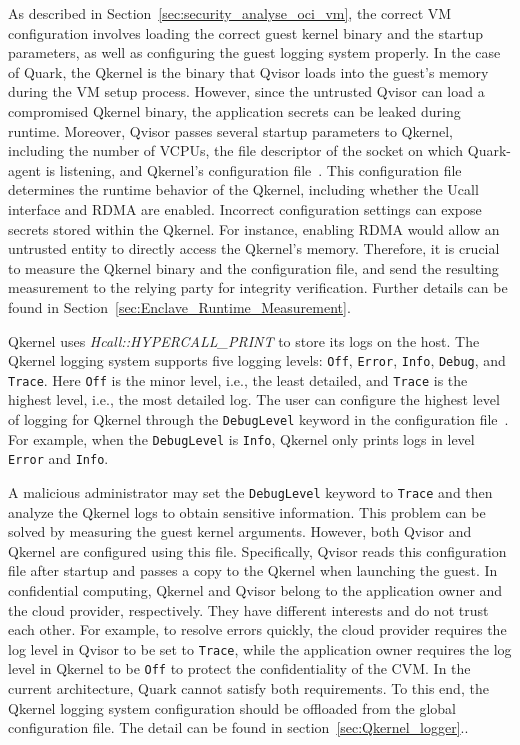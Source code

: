 As described in Section~\ref{sec:security_analyse_oci_vm}, the correct VM configuration involves loading the correct guest kernel binary and the startup parameters, as well as configuring the guest logging system properly. In the case of Quark, the Qkernel is the binary that Qvisor loads into the guest's memory during the VM setup process. However, 
since the untrusted Qvisor can load a compromised Qkernel binary, the application secrets can be leaked during runtime. Moreover, Qvisor passes several startup parameters to Qkernel, including the number of VCPUs, the file descriptor of the socket on which Quark-agent is listening, and Qkernel's configuration file~\cite*{quark_conf_file}. This configuration file 
determines the runtime behavior of the Qkernel, including whether the Ucall interface and RDMA are enabled. Incorrect configuration settings can expose secrets stored within the Qkernel. For instance, enabling RDMA would allow an untrusted entity to directly access the Qkernel's memory. Therefore, it is crucial to measure the Qkernel binary and the configuration 
file, and send the resulting measurement to the relying party for integrity verification. Further details can be found in Section~\ref{sec:Enclave_Runtime_Measurement}.

Qkernel uses \emph{Hcall::HYPERCALL\_PRINT} to store its logs on the host. The Qkernel logging system supports five logging levels: \texttt{Off}, \texttt{Error}, \texttt{Info}, \texttt{Debug}, and \texttt{Trace}. Here \texttt{Off} is the minor level, i.e., the least detailed, and \texttt{Trace} is 
the highest level, i.e., the most detailed log. The user can configure the highest level of logging for Qkernel through the \texttt{DebugLevel} keyword in the configuration file~\cite*{quark_conf_file}. For example, when the \texttt{DebugLevel} is \texttt{Info}, Qkernel only prints 
logs in level \texttt{Error} and \texttt{Info}.

A malicious administrator may set the \texttt{DebugLevel} keyword to \texttt{Trace} and then analyze the Qkernel logs to obtain sensitive information. This problem can be solved by measuring the guest kernel arguments. However, both Qvisor and Qkernel are configured using this file. Specifically, 
Qvisor reads this configuration file after startup and passes a copy to the Qkernel when launching the guest. In confidential computing, Qkernel and Qvisor belong to the application owner and the cloud provider, respectively. They have different interests and do not trust each other. 
For example, to resolve errors quickly, the cloud provider requires the log level in Qvisor to be set to \texttt{Trace}, while the application owner requires the 
log level in Qkernel to be \texttt{Off} to protect the confidentiality of the CVM. In the current architecture, Quark cannot satisfy both requirements. To this end, the Qkernel logging system configuration should be offloaded from the global configuration file. The detail can be found in section~\ref{sec:Qkernel_logger}..


